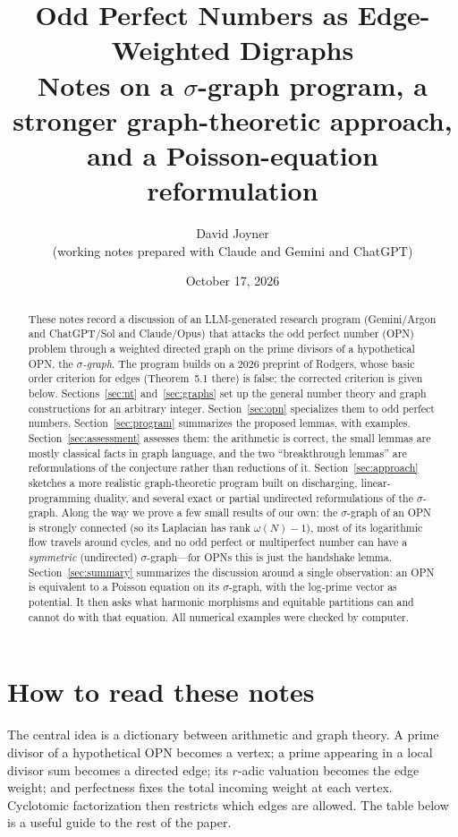 \documentclass[11pt]{article}
\title{Odd Perfect Numbers as Edge-Weighted Digraphs\\[4pt]
\large Notes on a $\sigma$-graph program, a stronger graph-theoretic approach,\\
and a Poisson-equation reformulation}
\author{David Joyner\\{\small (working notes prepared with Claude and Gemini and ChatGPT)}}
\date{October 17, 2026}
\theoremstyle{definition}
\theoremstyle{remark}
\begin{document}
\maketitle

\begin{abstract}
These notes record a discussion of an LLM-generated research program
(Gemini/Argon and ChatGPT/Sol and Claude/Opus) that attacks the odd perfect number (OPN)
problem through a weighted directed graph on the prime divisors of a
hypothetical OPN, the \emph{$\sigma$-graph}.  The program builds on a 2026
preprint of Rodgers, whose basic order criterion for edges (Theorem~5.1
there) is false; the corrected criterion is given below.
Sections~\ref{sec:nt} and~\ref{sec:graphs} set up the general number theory
and graph constructions for an arbitrary integer.  Section~\ref{sec:opn}
specializes them to odd perfect numbers.
Section~\ref{sec:program} summarizes the proposed lemmas, with examples. Section~\ref{sec:assessment} assesses
them: the arithmetic is correct, the small lemmas are mostly classical
facts in graph language, and the two ``breakthrough lemmas'' are
reformulations of the conjecture rather than reductions of it. Section~\ref{sec:approach}
sketches a more realistic graph-theoretic program built on discharging,
linear-programming duality, and several exact or partial undirected
reformulations of the $\sigma$-graph.  Along the way we prove a few small
results of our own: the $\sigma$-graph of an OPN is strongly connected (so its
Laplacian has rank $\omega(N)-1$), most of its logarithmic flow travels around
cycles, and no odd perfect or multiperfect number can have a
\emph{symmetric} (undirected) $\sigma$-graph---for OPNs this is just the
handshake lemma. Section~\ref{sec:summary} summarizes the discussion
around a single observation: an OPN is equivalent to a Poisson equation on
its $\sigma$-graph, with the log-prime vector as potential.  It then asks
what harmonic morphisms and equitable partitions can and cannot do with that
equation.
All numerical examples were checked by computer.
\end{abstract}

\tableofcontents

\section*{How to read these notes}
The central idea is a dictionary between arithmetic and graph theory.  A
prime divisor of a hypothetical OPN becomes a vertex; a prime appearing in a
local divisor sum becomes a directed edge; its $r$-adic valuation becomes the
edge weight; and perfectness fixes the total incoming weight at each vertex.
Cyclotomic factorization then restricts which edges are allowed.  The table
below is a useful guide to the rest of the paper.
\end{document}
